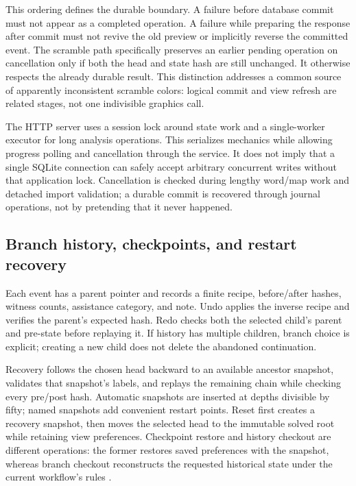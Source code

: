 \documentclass[a4paper,11pt]{article}
\begin{document}
This ordering defines the durable boundary. A failure before database commit must not appear as a completed operation. A failure while preparing the response after commit must not revive the old preview or implicitly reverse the committed event. The scramble path specifically preserves an earlier pending operation on cancellation only if both the head and state hash are still unchanged. It otherwise respects the already durable result. This distinction addresses a common source of apparently inconsistent scramble colors: logical commit and view refresh are related stages, not one indivisible graphics call.

The HTTP server uses a session lock around state work and a single-worker executor for long analysis operations. This serializes mechanics while allowing progress polling and cancellation through the service. It does not imply that a single SQLite connection can safely accept arbitrary concurrent writes without that application lock. Cancellation is checked during lengthy word/map work and detached import validation; a durable commit is recovered through journal operations, not by pretending that it never happened.

\subsection{Branch history, checkpoints, and restart recovery}

Each event has a parent pointer and records a finite recipe, before/after hashes, witness counts, assistance category, and note. Undo applies the inverse recipe and verifies the parent's expected hash. Redo checks both the selected child's parent and pre-state before replaying it. If history has multiple children, branch choice is explicit; creating a new child does not delete the abandoned continuation.

Recovery follows the chosen head backward to an available ancestor snapshot, validates that snapshot's labels, and replays the remaining chain while checking every pre/post hash. Automatic snapshots are inserted at depths divisible by fifty; named snapshots add convenient restart points. Reset first creates a recovery snapshot, then moves the selected head to the immutable solved root while retaining view preferences. Checkpoint restore and history checkout are different operations: the former restores saved preferences with the snapshot, whereas branch checkout reconstructs the requested historical state under the current workflow's rules \cite{sourcecode}.
\end{document}
